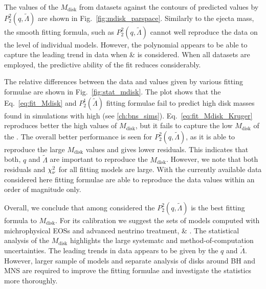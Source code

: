 The values of the $M_{\text{disk}}$ from datasets against the contours of predicted 
values by $P_2^2(q,\tilde{\Lambda})$ are shown in Fig.~\ref{fig:mdisk_parspace}.
Similarly to the ejecta mass, the smooth fitting formula, such as $P_2^2(q,\tilde{\Lambda})$
cannot well reproduce the data on the level of individual models. However, the 
polynomial appears to be able to capture the leading trend in data when 
\DSrefset{} \& \DSheatcool{} is considered.
When all datasets are employed, the predictive ability of the fit reduces considerably.

The relative differences between the data and values given by various fitting formulae are 
shown in Fig.~\ref{fig:stat_mdisk}.
The plot shows that the Eq.~\eqref{eq:fit_Mdisk} and $P_2^1(\tilde{\Lambda})$ fitting 
formulae fail to predict high disk masses found in simulations with high \mr{} 
(see \ref{ch:bns_sims}).
Eq.~\eqref{eq:fit_Mdisk_Kruger} reproduces better the high values of $M_{\text{disk}}$, 
but it fails to capture the low $M_{\text{disk}}$ of the \DSnone{}.
The overall better performance is seen for $P_2^2(q,\tilde{\Lambda})$, as it is able 
to reproduce the large $M_{\text{disk}}$ values and gives lower residuals.
This indicates that both, $q$ and $\tilde{\Lambda}$ are important to reproduce the 
$M_{\text{disk}}$.
However, we note that both residuals and $\chi_{\nu}^2$ for all fitting models are large.
With the currently available data considered here fitting formulae are able to reproduce 
the data values within an order of magnitude only.

Overall, we conclude that among considered the $P_2^2(q,\tilde{\Lambda})$ is the best 
fitting formula to $M_{\text{disk}}$. For its calibration we suggest the sets of 
models computed with michrophysical \acp{EOS} and advanced neutrino treatment, 
\DSrefset{} \& \DSheatcool{}.
The statistical analysis of the $M_{\text{disk}}$ highlights the large systematc 
and method-of-computation uncertainties. The leading trends in data appears to be given 
by the $q$ and $\tilde{\Lambda}$. However, larger sample of models and 
separate analysis of disks around \ac{BH} and \ac{MNS} are required to improve the 
fitting formulae and investigate the statistics more thoroughly. 









